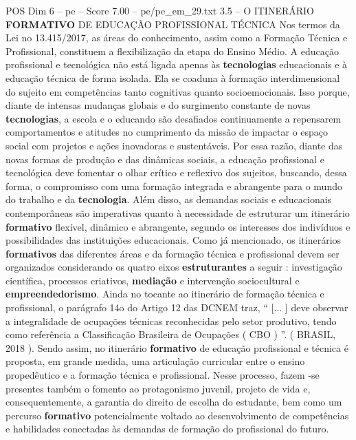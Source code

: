 \begin{textsample}{POS Dim 6 – pe – Score 7.00 – pe/pe\_em\_29.txt}  \label{ex:f6_pos_256}
3.5 – O ITINERÁRIO \textbf{FORMATIVO} DE EDUCAÇÃO PROFISSIONAL TÉCNICA Nos termos da Lei no 13.415/2017, as áreas do conhecimento, assim como a Formação Técnica e Profissional, constituem a flexibilização da etapa do Ensino Médio.
A educação profissional e tecnológica não está ligada apenas às \textbf{tecnologias} educacionais e à educação técnica de forma isolada.
Ela se coaduna à formação interdimensional do sujeito em competências tanto cognitivas quanto socioemocionais.
Isso porque, diante de intensas mudanças globais e do surgimento constante de novas \textbf{tecnologias}, a escola e o educando são desafiados continuamente a repensarem comportamentos e atitudes no cumprimento da missão de impactar o espaço social com projetos e ações inovadoras e sustentáveis.
Por essa razão, diante das novas formas de produção e das dinâmicas sociais, a educação profissional e tecnológica deve fomentar o olhar crítico e reflexivo dos sujeitos, buscando, dessa forma, o compromisso com uma formação integrada e abrangente para o mundo do trabalho e da \textbf{tecnologia}.
Além disso, as demandas sociais e educacionais contemporâneas são imperativas quanto à necessidade de estruturar um itinerário \textbf{formativo} flexível, dinâmico e abrangente, segundo os interesses dos indivíduos e possibilidades das instituições educacionais.
Como já mencionado, os itinerários \textbf{formativos} das diferentes áreas e da formação técnica e profissional devem ser organizados considerando os quatro eixos \textbf{estruturantes} a seguir : investigação científica, processos criativos, \textbf{mediação} e intervenção sociocultural e \textbf{empreendedorismo}.
Ainda no tocante ao itinerário de formação técnica e profissional, o parágrafo 14o do Artigo 12 das DCNEM traz, “ [... ] deve observar a integralidade de ocupações técnicas reconhecidas pelo setor produtivo, tendo como referência a Classificação Brasileira de Ocupações ( CBO ) ”. ( BRASIL, 2018 ).
Sendo assim, no itinerário \textbf{formativo} de educação profissional e técnica é proposta, em grande medida, uma articulação curricular entre o ensino propedêutico e a formação técnica e profissional.
Nesse processo, fazem -se presentes também o fomento ao protagonismo juvenil, projeto de vida e, consequentemente, a garantia do direito de escolha do estudante, bem como um percurso \textbf{formativo} potencialmente voltado ao desenvolvimento de competências e habilidades conectadas às demandas de formação do profissional do futuro.

\end{textsample}
